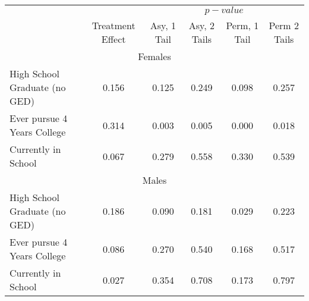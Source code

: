 \begin{tabular}{lccccc} \hline \hline
 & & \multicolumn{4}{c}{$p-value$} \\ 
 & Treatment Effect   & Asy, 1 Tail  & Asy, 2 Tails  & Perm, 1 Tail & Perm 2 Tails  \\  \hline 
 \multicolumn{6}{c}{Females} \\ \hline
High School Graduate (no GED) &     0.156 &     0.125 &     0.249 &     0.098 &     0.257 \\  
Ever pursue 4 Years College &     0.314 &     0.003 &     0.005 &     0.000 &     0.018 \\  
Currently in School &     0.067 &     0.279 &     0.558 &     0.330 &     0.539 \\  \hline
 \multicolumn{6}{c}{Males} \\ \hline
High School Graduate (no GED)  &     0.186 &     0.090 &     0.181 &     0.029 &     0.223 \\  
Ever pursue 4 Years College &     0.086 &     0.270 &     0.540 &     0.168 &     0.517 \\  
Currently in School &     0.027 &     0.354 &     0.708 &     0.173 &     0.797 \\  
\hline \hline \end{tabular}
